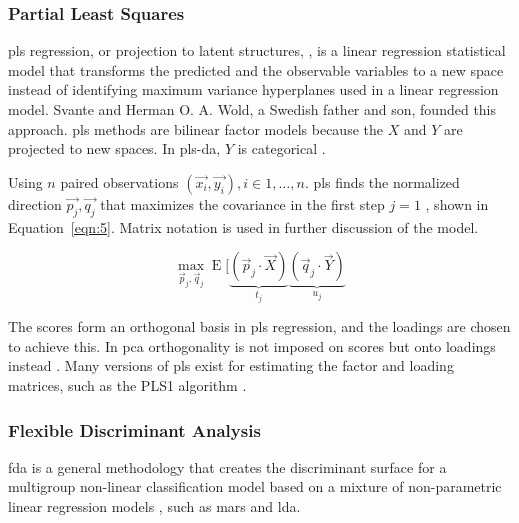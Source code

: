 \documentclass[sn-mathphys-num]{sn-jnl}%
\begin{document}
\subsubsection{Partial Least Squares}

\acrfull{pls} regression, or projection to latent structures, \cite{wold2001pls, abdi2010partial}, is a linear regression statistical model that transforms the predicted and the observable variables to a new space instead of identifying maximum variance hyperplanes used in a linear regression model. Svante and Herman O. A. Wold, a Swedish father and son, founded this approach. \acrshort{pls} methods are bilinear factor models because the $X$ and $Y$ are projected to new spaces. In \acrfull{pls-da}, $Y$ is categorical \cite{saebo2008lpls}.

Using $n$ paired observations $\left(\vec{x_{i}}, \vec{y_{i}}\right), i \in 1, \dots, n$. \acrshort{pls} finds the normalized direction $\vec{p_{j}}, \vec{q_{j}}$ that maximizes the covariance in the first step $j = 1$ \cite{youtubeYouTube}, shown in Equation~\ref{eqn:5}. Matrix notation is used in further discussion of the model.

\begin{equation}
	\max_{{\vec{p}}_{j},{\vec{q}}_{j}}\operatorname{E} [\underbrace{({\vec{p}}_{j}\cdot {\vec{X}})}_{t_{j}}\underbrace{({\vec{q}}_{j}\cdot {\vec{Y}})}_{u_{j}}
	\label{eqn:5}
\end{equation}

The scores form an orthogonal basis in \acrshort{pls} regression, and the loadings are chosen to achieve this. In \acrshort{pca} orthogonality is not imposed on scores but onto loadings instead \cite{lindgren1993kernel, de1994comments, dayal1997improved, de1993simpls, rannar1994pls, abdi2010partial}. Many versions of \acrshort{pls} exist for estimating the factor and loading matrices, such as the PLS1 algorithm \cite{takane2016pls, hoskuldsson1988pls}. 

\subsubsection{Flexible Discriminant Analysis}

\acrfull{fda} is a general methodology that creates the discriminant surface for a multigroup non-linear classification model based on a mixture of non-parametric linear regression models \cite{hastie1995penalized}, such as \acrfull{mars} and \acrfull{lda}.
\end{document}
